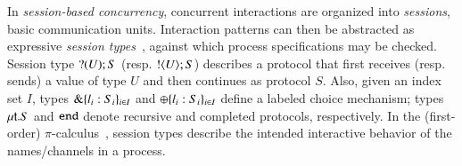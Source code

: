 In \emph{session-based concurrency}, concurrent interactions are organized into \emph{sessions}, basic communication units.
Interaction patterns can then be abstracted as expressive \emph{session types}~\cite{honda.vasconcelos.kubo:language-primitives}, against which process specifications may be checked. 
Session type $? (U) ; S$ (resp.  $! \langle U \rangle ; S$)
describes a protocol that first receives (resp. sends) a value of type $U$ and then continues as protocol $S$.
Also, given an index set $I$, types $\& \{l_i:S_i\}_{i \in I}$ 
and $\oplus \{l_i:S_i\}_{i \in I}$ 
define %
 a labeled choice mechanism; types 
$\mu\mathsf{t}.S$ 
and 
$\mathtt{end}$ denote recursive and completed protocols, respectively.
In the (first-order) $\pi$-calculus~\cite{MilnerR:calmp1}, 
session types describe the intended interactive behavior of the names/channels in a process.

